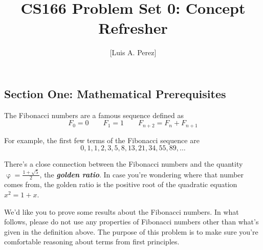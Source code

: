 \documentclass[12pt]{exam}
\newcommand*{\authorname}{[Luis A. Perez]}
\newcommand*{\psetnumber}{0}
\newcommand*{\psetdescription}{Concept Refresher}
\newcommand{\Q}[1]{\question{\large{\textbf{#1}}}}
\newcommand*{\bigo}[1]{O \left( #1 \right)}
\newcommand{\bi}[1]{\textit{\textbf{#1}}}
\begin{document}
\title{CS166 Problem Set \psetnumber: \psetdescription}
\author{\authorname}
\date{}
\maketitle
\thispagestyle{headandfoot}

\begin{center}
\section*{Section One: Mathematical Prerequisites}    
\end{center}

\begin{questions}

\Q{Problem One: Fibonacci Fun! (3 Points)}

The Fibonacci numbers are a famous sequence defined as
\[
  F_0 = 0 \qquad F_1 = 1 \qquad F_{n+2} = F_n + F_{n+1}
\]

For example, the first few terms of the Fibonacci sequence are
\[
  0, 1, 1, 2, 3, 5, 8, 13, 21, 34, 55, 89, \ldots
\]

There's a close connection between the Fibonacci numbers and the quantity $\upvarphi=\frac{1+\sqrt{5}}{2}$, the \bi{golden ratio}. In case you're wondering where that number comes from, the golden ratio is the positive root of the quadratic equation $x^2 = 1 + x$.

We'd like you to prove some results about the Fibonacci numbers. In what follows, please do not use any properties of Fibonacci numbers other than what's given in the definition above. The purpose of this problem is to make sure you're comfortable reasoning about terms from first principles.

\end{questions}
\end{document}
